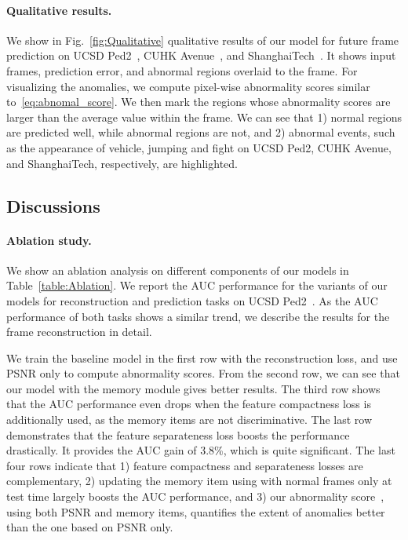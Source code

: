 \documentclass[10pt,twocolumn,letterpaper]{article}
\begin{document}
		
\vspace{-0.4cm}
		\paragraph{Qualitative results.}
We show in Fig.~\ref{fig:Qualitative} qualitative results of our model for future frame prediction on UCSD Ped2~\cite{li2013anomaly}, CUHK Avenue~\cite{lu2013abnormal}, and ShanghaiTech~\cite{luo2017revisit}. It shows input frames, prediction error, and abnormal regions overlaid to the frame. For visualizing the anomalies, we compute pixel-wise abnormality scores similar to~\eqref{eq:abnomal_score}. We then mark the regions whose abnormality scores are larger than the average value within the frame. We can see that 1) normal regions are predicted well, while abnormal regions are not, and 2) abnormal events, such as the appearance of vehicle, jumping and fight on UCSD Ped2, CUHK Avenue, and ShanghaiTech, respectively, are highlighted.



			
	
	
	\subsection{Discussions}\label{sec:discussion}
\vspace{-0.1cm}
		\paragraph{Ablation study.}
			We show an ablation analysis on different components of our models in Table~\ref{table:Ablation}. We report the AUC performance for the variants of our models for reconstruction and prediction tasks on UCSD Ped2~\cite{li2013anomaly}. As the AUC performance of both tasks shows a similar trend, we describe the results for the frame reconstruction in detail. 

We train the baseline model in the first row with the reconstruction loss, and use PSNR only to compute abnormality scores. From the second row, we can see that our model with the memory module gives better results. The third row shows that the AUC performance even drops when the feature compactness loss is additionally used, as the memory items are not discriminative. The last row demonstrates that the feature separateness loss boosts the performance drastically. It provides the AUC gain of 3.8\%, which is quite significant. The last four rows indicate that 1) feature compactness and separateness losses are complementary, 2) updating the memory item using  with normal frames only at test time largely boosts the AUC performance, and 3) our abnormality score~, using both PSNR and memory items, quantifies the extent of anomalies better than the one based on PSNR only. 
\end{document}
